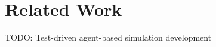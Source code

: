 \section{Related Work}
TODO: Test-driven agent-based simulation development \cite{collier_test-driven_2013}

